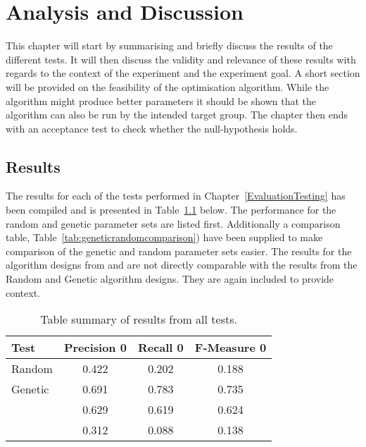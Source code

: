 \chapter{Analysis and Discussion} %

\label{AnalysisAndDiscussion}

This chapter will start by summarising and briefly discuss the results of the different tests. It will then discuss the validity and relevance of these results with regards to the context of the experiment and the experiment goal. A short section will be provided on the feasibility of the optimisation algorithm. While the algorithm might produce better parameters it should be shown that the algorithm can also be run by the intended target group. The chapter then ends with an acceptance test to check whether the null-hypothesis holds.

\section{Results}
\label{Results}
The results for each of the tests performed in Chapter~\ref{EvaluationTesting} has been compiled and is presented in Table~\ref{tab:summarytableresults} below. The performance for the random and genetic parameter sets are listed first. Additionally a comparison table, Table~\ref{tab:geneticrandomcomparison}) have been supplied to make comparison of the genetic and random parameter sets easier. The results for the algorithm designs from \citeauthor{Moe2013compact} and \citeauthor{Oren1998} are not directly comparable with the results from the Random and Genetic algorithm designs. They are again included to provide context.

\begin{table}[H]
\begin{center}
\begin{tabular}{|l|ccc|}
\hline
Test & Precision 0 & Recall 0 & F-Measure 0\\ 
\hline
Random 						&   0.422& 	  0.202& 	0.188\\ 
Genetic 					&   0.691&    0.783&    0.735\\
\citeauthor{Moe2013compact} &   0.629&    0.619&    0.624\\ 
\citeauthor{Oren1998}		&   0.312&    0.088&    0.138\\ 
\hline
\end{tabular}
\end{center}
\caption{Table summary of results from all tests.}
\label{tab:summarytableresults}
\end{table}

